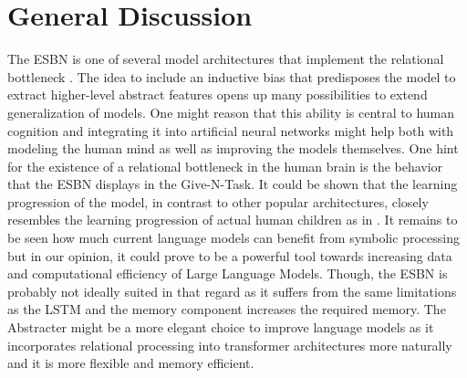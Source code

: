 \section{General Discussion}
The ESBN is one of several model architectures that implement the relational bottleneck \textcite{webb_relational_2023}. The idea to include an inductive bias that predisposes the model to extract higher-level abstract features opens up many possibilities to extend generalization of models. One might reason that this ability is central to human cognition and integrating it into artificial neural networks might help both with modeling the human mind as well as improving the models themselves. One hint for the existence of a relational bottleneck in the human brain is the behavior that the ESBN displays in the Give-N-Task. It could be shown that the learning progression of the model, in contrast to other popular architectures, closely resembles the learning progression of actual human children \textcite{webb_emergent_2021} as in \textcite{webb_relational_2023}. \newline 
It remains to be seen how much current language models can benefit from symbolic processing but in our opinion, it could prove to be a powerful tool towards increasing data and computational efficiency of Large Language Models. Though, the ESBN is probably not ideally suited in that regard as it suffers from the same limitations as the LSTM and the memory component increases the required memory. \newline
The Abstracter \textcite{altabaa_abstractors_2023} might be a more elegant choice to improve language models as it incorporates relational processing into transformer architectures more naturally and it is more flexible and memory efficient. 